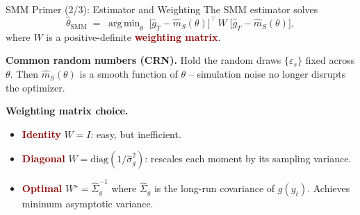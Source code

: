 \documentclass[10pt,aspectratio=169]{beamer}
\newcommand{\emphc}[1]{\textbf{\textcolor{darkred}{#1}}}
\DeclareMathOperator*{\argmin}{arg\,min}
\begin{document}
\begin{frame}{SMM Primer (2/3): Estimator and Weighting}
\small
The SMM estimator solves
\[
    \widehat\theta_{\text{SMM}} \;=\; \argmin_{\theta} \;
        \bigl[\widehat g_T - \widehat m_S(\theta)\bigr]^{\!\top}\, W \;
        \bigl[\widehat g_T - \widehat m_S(\theta)\bigr],
\]
where $W$ is a positive-definite \emphc{weighting matrix}.

\vspace{0.3em}
\textbf{Common random numbers (CRN).} Hold the random draws $\{\varepsilon_s\}$ fixed across $\theta$. Then $\widehat m_S(\theta)$ is a smooth function of $\theta$ -- simulation noise no longer disrupts the optimizer.

\vspace{0.3em}
\textbf{Weighting matrix choice.}
\begin{itemize}\itemsep1pt
    \item \emphc{Identity} $W = I$: easy, but inefficient.
    \item \emphc{Diagonal} $W = \mathrm{diag}(1/\widehat\sigma_g^2)$: rescales each moment by its sampling variance.
    \item \emphc{Optimal} $W^\star = \widehat\Sigma_g^{-1}$ where $\widehat\Sigma_g$ is the long-run covariance of $g(y_t)$. Achieves minimum asymptotic variance.
\end{itemize}
\end{frame}
\end{document}
